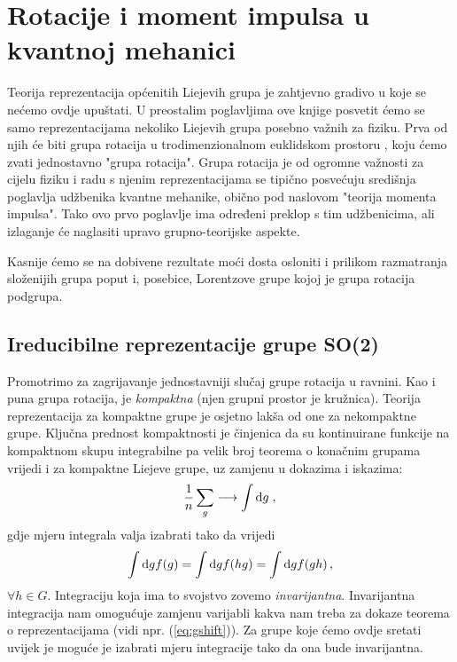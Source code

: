 
\chapter{Rotacije i moment impulsa u kvantnoj mehanici}
\label{ch:rotacije}

Teorija reprezentacija općenitih Liejevih grupa je zahtjevno
gradivo u koje se nećemo ovdje upuštati. U preostalim
poglavljima ove knjige posvetit ćemo se samo
reprezentacijama nekoliko Liejevih grupa posebno važnih
za fiziku. Prva od njih će biti grupa rotacija u trodimenzionalnom
euklidskom prostoru , koju ćemo  zvati
jednostavno "grupa rotacija". Grupa rotacija je od ogromne
važnosti za cijelu fiziku i radu s njenim reprezentacijama
se tipično posvećuju središnja poglavlja udžbenika kvantne mehanike,
obično pod naslovom "teorija momenta impulsa".
Tako ovo prvo poglavlje ima određeni preklop s tim udžbenicima, ali
izlaganje će naglasiti upravo grupno-teorijske aspekte.

Kasnije ćemo se na dobivene rezultate moći dosta osloniti i
prilikom razmatranja složenijih grupa poput  i, posebice,
Lorentzove grupe  kojoj je grupa rotacija podgrupa.

\section{Ireducibilne reprezentacije grupe SO(2)}

Promotrimo za zagrijavanje jednostavniji slučaj grupe 
rotacija u ravnini. Kao i puna grupa rotacija,  je
\emph{kompaktna} (njen grupni prostor je kružnica).
Teorija reprezentacija za kompaktne grupe je osjetno lakša
 od one za nekompaktne grupe.
Ključna prednost kompaktnosti je činjenica da su kontinuirane funkcije
na kompaktnom skupu integrabilne pa 
velik broj teorema o konačnim grupama vrijedi i za kompaktne Liejeve
grupe, uz zamjenu u dokazima i iskazima:
\begin{equation}
    \frac{1}{n} \sum_{g} \longrightarrow \int \textrm{d} g \;,
\end{equation}
gdje mjeru integrala valja izabrati tako da vrijedi
\begin{equation}
  \int \textrm{d} g f(g) = \int \textrm{d} g f(hg) = \int \textrm{d} g f(gh) \,,
\end{equation}
$\forall h \in G$.
Integraciju koja ima to svojstvo zovemo \emph{invarijantna}.  
Invarijantna integracija nam omogućuje zamjenu
varijabli kakva nam treba za dokaze teorema o reprezentacijama
(vidi npr. (\ref{eq:gshift})).
Za grupe koje ćemo ovdje sretati uvijek je moguće je izabrati
mjeru integracije tako da ona bude invarijantna.

